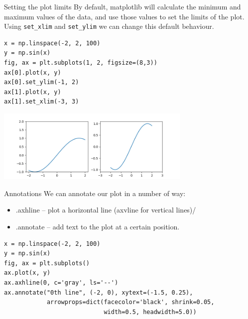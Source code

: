 \documentclass[10pt]{beamer}
\begin{document}
\begin{frame}[label={sec:orgddd9490},fragile]{Setting the plot limits}
 By default, matplotlib will calculate the minimum and maximum values of the
data, and use those values to set the limits of the plot. Using \texttt{set\_xlim} and
\texttt{set\_ylim} we can change this default behaviour.

\begin{verbatim}
x = np.linspace(-2, 2, 100)
y = np.sin(x)
fig, ax = plt.subplots(1, 2, figsize=(8,3))
ax[0].plot(x, y)
ax[0].set_ylim(-1, 2)
ax[1].plot(x, y)
ax[1].set_xlim(-3, 3)
\end{verbatim}

\begin{center}
\includegraphics[width=0.7\textwidth]{images/limits.png}
\end{center}
\end{frame}

\begin{frame}[label={sec:org91d9a11},fragile]{Annotations}
 We can annotate our plot in a number of way:
\begin{itemize}
\item .axhline -- plot a horizontal line (axvline for vertical lines)/
\item .annotate -- add text to the plot at a certain position.
\end{itemize}

\begin{verbatim}
x = np.linspace(-2, 2, 100)
y = np.sin(x)
fig, ax = plt.subplots()
ax.plot(x, y)
ax.axhline(0, c='gray', ls='--')
ax.annotate("0th line", (-2, 0), xytext=(-1.5, 0.25),
            arrowprops=dict(facecolor='black', shrink=0.05,
                            width=0.5, headwidth=5.0))
\end{verbatim}
\end{frame}
\end{document}
